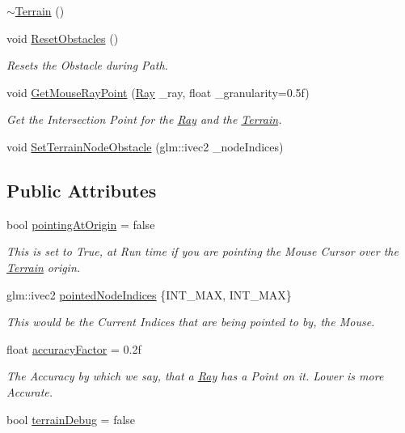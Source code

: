 \begin{DoxyCompactItemize}
$$\mbox{\hyperlink{classpiolot_1_1_terrain_afcbff7ea78c7a5a5eb0032de624c4109}{$\sim$\+Terrain}} ()
\item 
void \mbox{\hyperlink{classpiolot_1_1_terrain_ac3809c8441d17080168a077f97827816}{Reset\+Obstacles}} ()
\begin{DoxyCompactList}\small\item\em Resets the Obstacle during Path. \end{DoxyCompactList}\item 
void \mbox{\hyperlink{classpiolot_1_1_terrain_a527f6f0fe0d2085280e95bf6540987a2}{Get\+Mouse\+Ray\+Point}} (\mbox{\hyperlink{classpiolot_1_1_ray}{Ray}} \+\_\+ray, float \+\_\+granularity=0.\+5f)
\begin{DoxyCompactList}\small\item\em Get the Intersection Point for the \mbox{\hyperlink{classpiolot_1_1_ray}{Ray}} and the \mbox{\hyperlink{classpiolot_1_1_terrain}{Terrain}}. \end{DoxyCompactList}\item 
void \mbox{\hyperlink{classpiolot_1_1_terrain_a6ec5d3beab0a60517cff5603b66fd19e}{Set\+Terrain\+Node\+Obstacle}} (glm\+::ivec2 \+\_\+node\+Indices)
\end{DoxyCompactItemize}
\subsection*{Public Attributes}
\begin{DoxyCompactItemize}
\item 
bool \mbox{\hyperlink{classpiolot_1_1_terrain_a408da4b61ad3fd021d84b71827c86bd6}{pointing\+At\+Origin}} = false
\begin{DoxyCompactList}\small\item\em This is set to True, at Run time if you are pointing the Mouse Cursor over the \mbox{\hyperlink{classpiolot_1_1_terrain}{Terrain}} origin. \end{DoxyCompactList}\item 
glm\+::ivec2 \mbox{\hyperlink{classpiolot_1_1_terrain_a23d4f9114f5d9830e08ac411150b07e6}{pointed\+Node\+Indices}} \{I\+N\+T\+\_\+\+M\+AX, I\+N\+T\+\_\+\+M\+AX\}
\begin{DoxyCompactList}\small\item\em This would be the Current Indices that are being pointed to by, the Mouse. \end{DoxyCompactList}\item 
float \mbox{\hyperlink{classpiolot_1_1_terrain_a3174244bc7ad70014bbcf8d400231cd7}{accuracy\+Factor}} = 0.\+2f
\begin{DoxyCompactList}\small\item\em The Accuracy by which we say, that a \mbox{\hyperlink{classpiolot_1_1_ray}{Ray}} has a Point on it. Lower is more Accurate. \end{DoxyCompactList}\item 
bool \mbox{\hyperlink{classpiolot_1_1_terrain_af15b6de452d8225d07d7d4ae48d4f154}{terrain\+Debug}} = false
\end{DoxyCompactItemize}
